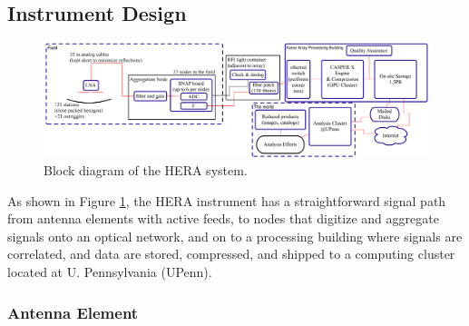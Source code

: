 \documentclass[preprint]{aastex}
\newcommand{\compress}{\vspace{-0.3in}}
\begin{document}
\compress
\subsection{Instrument Design}
\label{InstDes}
%
%

\begin{figure}[t]
\centering
\includegraphics[width=\textwidth]{plots/Engineering/HERA_high_level_block_diagram.png}
\caption{\small
Block diagram of the HERA system.}
\label{fig:blockDiagram} 
\end{figure}

As shown in Figure \ref{fig:blockDiagram}, the HERA instrument has a straightforward signal
path from antenna elements
with active feeds, to nodes that digitize and aggregate signals onto an optical network,
and on to a processing building where signals are correlated, and data are stored, compressed,
and shipped to a computing cluster located at U. Pennsylvania (UPenn). 

\compress
\subsubsection{Antenna Element}
\end{document}
